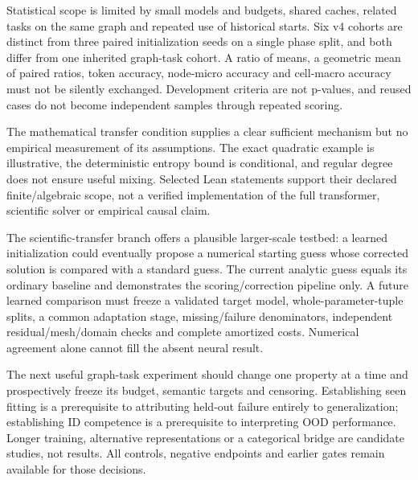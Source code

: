 \documentclass[10pt,letterpaper,twocolumn]{article}
\begin{document}
Statistical scope is limited by small models and budgets, shared caches, related tasks on the same graph and repeated use of historical starts. Six v4 cohorts are distinct from three paired initialization seeds on a single phase split, and both differ from one inherited graph-task cohort. A ratio of means, a geometric mean of paired ratios, token accuracy, node-micro accuracy and cell-macro accuracy must not be silently exchanged. Development criteria are not p-values, and reused cases do not become independent samples through repeated scoring.

The mathematical transfer condition supplies a clear sufficient mechanism but no empirical measurement of its assumptions. The exact quadratic example is illustrative, the deterministic entropy bound is conditional, and regular degree does not ensure useful mixing. Selected Lean statements support their declared finite/\allowbreak{}algebraic scope, not a verified implementation of the full transformer, scientific solver or empirical causal claim.

The scientific-transfer branch offers a plausible larger-scale testbed: a learned initialization could eventually propose a numerical starting guess whose corrected solution is compared with a standard guess. The current analytic guess equals its ordinary baseline and demonstrates the scoring/\allowbreak{}correction pipeline only. A future learned comparison must freeze a validated target model, whole-parameter-tuple splits, a common adaptation stage, missing/\allowbreak{}failure denominators, independent residual/\allowbreak{}mesh/\allowbreak{}domain checks and complete amortized costs. Numerical agreement alone cannot fill the absent neural result.

The next useful graph-task experiment should change one property at a time and prospectively freeze its budget, semantic targets and censoring. Establishing seen fitting is a prerequisite to attributing held-out failure entirely to generalization; establishing ID competence is a prerequisite to interpreting OOD performance. Longer training, alternative representations or a categorical bridge are candidate studies, not results. All controls, negative endpoints and earlier gates remain available for those decisions.
\end{document}
